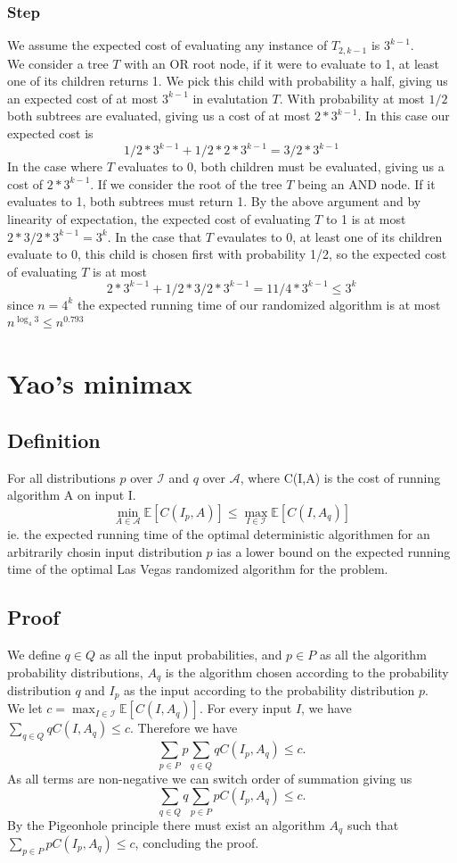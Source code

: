 \documentclass[a4paper, fleqn]{article}
\def\A{\mathcal{A}}
\def\I{\mathcal{I}}
\def\E{\mathbb{E}}
\begin{document}
\subsubsection*{Step}
We assume the expected cost of evaluating any instance of $T_{2,k-1}$ is $3^{k-1}$.\\
We consider a tree $T$ with an OR root node, if it were to evaluate to 1, at least one of its children returns 1. We pick this child with probability a half, giving us an expected cost of at most $3^{k-1}$ in evalutation $T$. With probability at most $1/2$ both subtrees are evaluated, giving us a cost of at most $2 * 3^{k-1}$. In this case our expected cost is
$$
1/2 * 3^{k-1} + 1/2 * 2 * 3^{k-1} = 3/2 * 3^{k-1}
$$
In the case where $T$ evaluates to 0, both children must be evaluated, giving us a cost of $2 * 3^{k-1}$.
If we consider the root of the tree $T$ being an AND node. If it evaluates to 1, both subtrees must return 1. By the above argument and by linearity of expectation, the expected cost of evaluating $T$ to 1 is at most $2 * 3/2 * 3^{k-1} = 3^k$. In the case that $T$ evaulates to 0, at least one of its children evaluate to 0, this child is chosen first with probability 1/2, so the expected cost of evaluating $T$ is at most
$$
2*3^{k-1} + 1/2 * 3/2 * 3^{k-1} = 11/4 * 3^{k-1} \leq 3^k
$$
since $n= 4^k$ the expected running time of our randomized algorithm is at most $n^{\log_4 3} \leq n^{0.793}$
\section{Yao's minimax}
\subsection{Definition}
For all distributions $p$ over $\I$ and $q$ over $\A$, where C(I,A) is the cost of running algorithm A on input I.
$$
\min_{A \in \A} \E[C(I_p, A)] \leq \max_{I\in\I} \E[C(I,A_q)]
$$
ie. the expected running time of the optimal deterministic algorithmen for an arbitrarily chosin input distribution $p$ ias a lower bound on the expected running time of the optimal Las Vegas randomized algorithm for the problem.
\subsection{Proof}
We define $q \in Q$ as all the input probabilities, and $p\in P$ as all the algorithm probability distributions, $A_q$ is the algorithm chosen according to the probability distribution $q$ and $I_p$ as the input according to the probability distribution $p$.\\
We let $c = \max_{I\in\I} \E[C(I,A_q)]$. For every input $I$, we have $\sum_{q \in Q} q C(I,A_q) \leq c$. Therefore we have
$$\sum_{p \in P} p \sum_{q \in Q} q C(I_p,A_q) \leq c.$$
As all terms are non-negative we can switch order of summation giving us
$$\sum_{q \in Q} q \sum_{p \in P} p C(I_p,A_q) \leq c.$$
By the Pigeonhole principle there must exist an algorithm $A_q$ such that $\sum_{p \in P} p C(I_p,A_q) \leq c$, concluding the proof.
\end{document}
